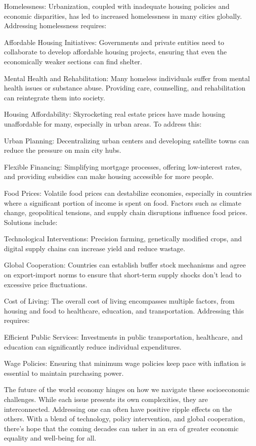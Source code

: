 Homelessness:  Urbanization, coupled with inadequate housing policies and economic disparities, has led to increased homelessness in many cities globally. Addressing homelessness requires:

Affordable Housing Initiatives: Governments and private entities need to collaborate to develop affordable housing projects, ensuring that even the economically weaker sections can find shelter.

Mental Health and Rehabilitation: Many homeless individuals suffer from mental health issues or substance abuse. Providing care, counselling, and rehabilitation can reintegrate them into society.

Housing Affordability:
Skyrocketing real estate prices have made housing unaffordable for many, especially in urban areas. To address this:

Urban Planning: Decentralizing urban centers and developing satellite towns can reduce the pressure on main city hubs.

Flexible Financing: Simplifying mortgage processes, offering low-interest rates, and providing subsidies can make housing accessible for more people.

Food Prices:
Volatile food prices can destabilize economies, especially in countries where a significant portion of income is spent on food. Factors such as climate change, geopolitical tensions, and supply chain disruptions influence food prices. Solutions include:

Technological Interventions: Precision farming, genetically modified crops, and digital supply chains can increase yield and reduce wastage.

Global Cooperation: Countries can establish buffer stock mechanisms and agree on export-import norms to ensure that short-term supply shocks don't lead to excessive price fluctuations.

Cost of Living:  The overall cost of living encompasses multiple factors, from housing and food to healthcare, education, and transportation. Addressing this requires:

Efficient Public Services: Investments in public transportation, healthcare, and education can significantly reduce individual expenditures.

Wage Policies: Ensuring that minimum wage policies keep pace with inflation is essential to maintain purchasing power.

The future of the world economy hinges on how we navigate these socioeconomic challenges. While each issue presents its own complexities, they are interconnected. Addressing one can often have positive ripple effects on the others. With a blend of technology, policy intervention, and global cooperation, there's hope that the coming decades can usher in an era of greater economic equality and well-being for all.

